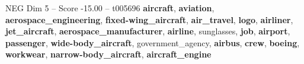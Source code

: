 \begin{textsample}{NEG Dim 5 – Score -15.00 – t005696}  \label{ex:f5_neg_023}
\textbf{aircraft}, \textbf{aviation}, \textbf{aerospace\_engineering}, \textbf{fixed-wing\_aircraft}, \textbf{air\_travel}, \textbf{logo}, \textbf{airliner}, \textbf{jet\_aircraft}, \textbf{aerospace\_manufacturer}, \textbf{airline}, sunglasses, \textbf{job}, \textbf{airport}, \textbf{passenger}, \textbf{wide-body\_aircraft}, government\_agency, \textbf{airbus}, \textbf{crew}, \textbf{boeing}, \textbf{workwear}, \textbf{narrow-body\_aircraft}, \textbf{aircraft\_engine}

\end{textsample}
